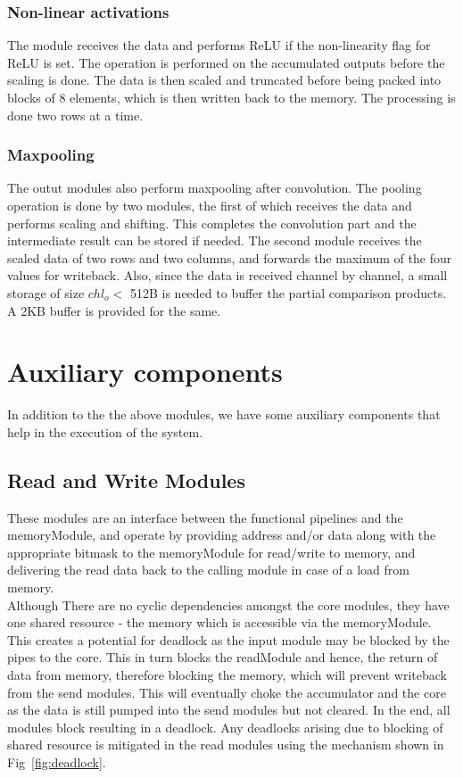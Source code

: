 \documentclass[a4paper,12pt, final]{report}
\begin{document}
\subsubsection{Non-linear activations}

The module receives the data and performs ReLU if the non-linearity flag for ReLU is set. The operation is performed on the accumulated outputs before the scaling is done. The data is then scaled and truncated before being packed into blocks of 8 elements, which is then written back to the memory. The processing is done two rows at a time. 

\subsubsection{Maxpooling}
The outut modules also perform maxpooling after convolution. The pooling operation is done by two modules, the first of which receives the data and performs scaling and shifting. This completes the convolution part and the intermediate result can be stored if needed. The second module receives the scaled data of two rows and two columns, and forwards the maximum of the four values for writeback. Also, since the data is received channel by channel, a small storage of size $chl_o <$ 512B is needed to buffer the partial comparison products. A 2KB buffer is provided for the same.


\section{Auxiliary components}
In addition to the the above modules, we have some auxiliary components that help in the execution of the system.

\subsection{Read and Write Modules}

These modules are an interface between the functional pipelines and the memoryModule, and operate by providing address and/or data along with the appropriate bitmask to the memoryModule for read/write to memory, and delivering the read data back to the calling module in case of a load from memory.
\\

Although There are no cyclic dependencies amongst the core modules, they have one shared resource - the memory which is accessible via the memoryModule. This creates a potential for deadlock as the input module may be blocked by the pipes to the core. This in turn blocks the readModule and hence, the return of data from memory, therefore blocking the memory, which will prevent writeback from the send modules. This will eventually choke the accumulator and the core as the data is still pumped into the send modules but not cleared. In the end, all modules block resulting in a deadlock. Any deadlocks arising due to blocking of shared resource is mitigated in the read modules using the mechanism shown in Fig~\ref{fig:deadlock}.
\\
\end{document}
